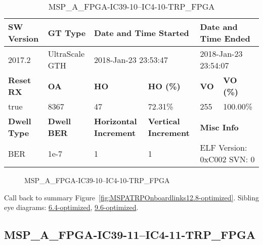 \begin{table}[h]
\centering
\caption{MSP\_A\_FPGA-IC39-10--IC4-10-TRP\_FPGA}
\label{tab:MSPAFPGAIC3910IC410TRPFPGA12.8-optimized}
\begin{tabular}{@{}|l|l|l|l|l|l|@{}}
\toprule
\textbf{SW Version}                & \textbf{GT Type}   & \multicolumn{2}{l|}{\textbf{Date and Time Started}}            & \multicolumn{2}{l|}{\textbf{Date and Time Ended}}        \\ \midrule
2017.2                       & UltraScale GTH          & \multicolumn{2}{l|}{2018-Jan-23 23:53:47}                   & \multicolumn{2}{l|}{2018-Jan-23 23:54:07}               \\ \midrule
\textbf{Reset RX}                  & \textbf{OA} & \textbf{HO}   & \textbf{HO (\%)} & \textbf{VO} & \textbf{VO (\%)} \\ \midrule
true & 8367        & 47          & 72.31\%        & 255        & 100.00\%       \\ \midrule
\textbf{Dwell Type}                & \textbf{Dwell BER} & \textbf{Horizontal Increment} & \textbf{Vertical Increment}    & \multicolumn{2}{l|}{\textbf{Misc Info}}                  \\ \midrule
BER                            & 1e-7        & 1        & 1           & \multicolumn{2}{l|}{ELF Version: 0xC002 SVN: 0}                         \\ \bottomrule
\end{tabular}
\end{table}

\begin{figure}[h]
\caption{MSP\_A\_FPGA-IC39-10--IC4-10-TRP\_FPGA} \label{fig:MSPAFPGAIC3910IC410TRPFPGA12.8-optimized}
\end{figure}

Call back to summary Figure~\ref{fig:MSPATRPOnboardlinks12.8-optimized}.
Sibling eye diagrams: \hyperref[sec:MSPAFPGAIC3910IC410TRPFPGA6.4-optimized]{6.4-optimized}, \hyperref[sec:MSPAFPGAIC3910IC410TRPFPGA9.6-optimized]{9.6-optimized}.

\clearpage
\newpage


\subsection{MSP\_A\_FPGA-IC39-11--IC4-11-TRP\_FPGA}\label{sec:MSPAFPGAIC3911IC411TRPFPGA12.8-optimized}

